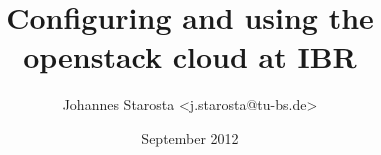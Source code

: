       \title{Configuring and using the openstack cloud at IBR}
\author{Johannes Starosta <j.starosta@tu-bs.de>}
\date{September 2012}
\maketitle
